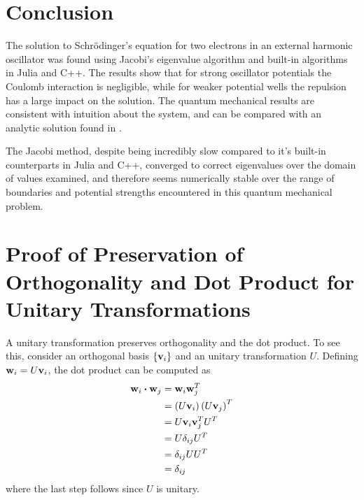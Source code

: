 \documentclass[aps,reprint]{revtex4-1}
\newcommand\blankpage{%
  \null
  \thispagestyle{empty}%
  \addtocounter{page}{-1}%
  \newpage}
\begin{document}
\section{Conclusion}
The solution to Schrödinger's equation for two electrons in an external
harmonic oscillator was found using Jacobi's eigenvalue algorithm and built-in
algorithms in Julia and C++. The results show that for strong oscillator potentials
the Coulomb interaction is negligible, while for weaker potential wells the repulsion
has a large impact on the solution. The quantum mechanical results are consistent with
intuition about the system, and can be compared with an analytic solution found
in \cite{taut}.

The Jacobi method, despite being incredibly slow compared to it's built-in
counterparts in Julia and C++, converged to correct eigenvalues over the domain
of values examined, and therefore seems numerically stable over the range of
boundaries and potential strengths encountered in this quantum mechanical problem.
\label{sec:conclusion}

\blankpage
\appendix
\section{Proof of Preservation of Orthogonality and Dot Product for Unitary Transformations}
A unitary transformation preserves orthogonality and the dot product. To see
this, consider an orthogonal basis \(\{\vb{v}_{i}\}\) and an unitary
transformation \(U\). Defining \(\vb{w}_{i}=U\vb{v}_{i}\), the dot product can
be computed as
\begin{align*}
  \vb{w}_{i}\vdot \vb{w}_{j} &= \vb{w}_{i}\vb{w}_{j}^{T}\\
                             &= \left( U\vb{v}_{i} \right)\left( U\vb{v}_{j} \right)^{T}\\
                             &= U\vb{v}_{i}\vb{v}_{j}^{T}U^{T}\\
                             &= U\delta_{ij}U^{T}\\
                             &= \delta_{ij}UU^{T}\\
                             &= \delta_{ij}
\end{align*}
where the last step follows since \(U\) is unitary.
\blankpage
\end{document}
